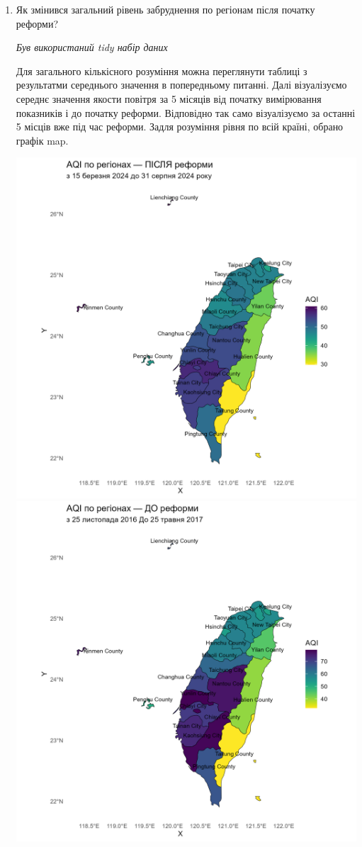 \documentclass{article}
\begin{document}
\begin{enumerate}
    \item Як змінився загальний рівень забруднення по регіонам після початку реформи?
    
    \quad \textit{Був використаний tidy набір даних}

    Для загального кількісного розуміння можна переглянути таблиці з результатми середнього значення в попередньому питанні. 
    Далі візуалізуємо середнє значення якости повітря за 5 місяців від початку вимірювання показників і до початку реформи. Відповідно так само візуалізуємо за останні 5 місців вже під час реформи. 
    Задля розуміння рівня по всій країні, обрано графік map. 
    
    \begin{center}
    \includegraphics[width=6in]{plots/question5/map_after_reform.png}
    \includegraphics[width=6in]{plots/question5/map_before_reform.png}

\end{center}
\end{enumerate}
\end{document}

